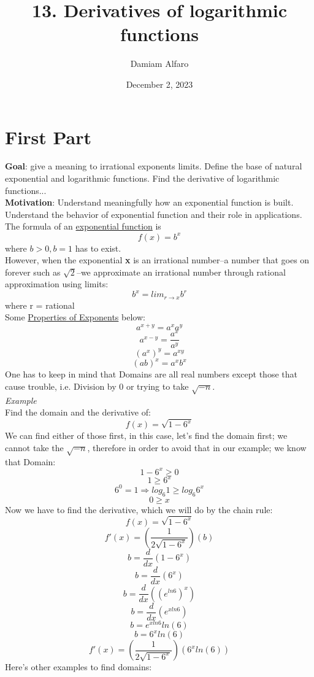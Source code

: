 \documentclass[12pt, letterpaper]{article}
\title{13. Derivatives of logarithmic functions}
\author{Damiam Alfaro}
\date{December 2, 2023} %
\begin{document}
\maketitle
\section{First Part}
\textbf{Goal}: give a meaning to irrational exponents limits. Define the base of natural exponential and logarithmic functions. Find the derivative of logarithmic functions...\\
\newline
\textbf{Motivation}: Understand meaningfully how an exponential function is built. Understand the behavior of exponential function and their role in applications.\\
\newline
The formula of an \underline{exponential function} is
\[f(x) = b^x \] where \(b > 0, b = 1\) has to exist.\\
\newline
However, when the exponential \textbf{x} is an irrational number--a number that goes on forever such as \(\sqrt{2}\)--we approximate an irrational number through rational approximation using limits:
\[b^x = lim_{r \to x} b^r\] where r = rational\\
\newline
Some \underline{Properties of Exponents} below:
\[a^{x+y} = a^xa^y\]
\[a^{x-y} = \frac{a^x}{a^y}\]
\[(a^{x})^{y} = a^{xy}\]
\[(ab)^{x} = a^{x}b^{x}\]
\newline
One has to keep in mind that Domains are all real numbers except those that cause trouble, i.e. Division by 0 or trying to take \(\sqrt{-n}\). \\
\newline
\textit{Example}\\
Find the domain and the derivative of:
\[f(x) = \sqrt{1-6^{x}}\]
We can find either of those first, in this case, let's find the domain first; we cannot take the \(\sqrt{-n}\), therefore in order to avoid that in our example; we know that Domain:
\[1-6^x \geq 0\]
\[1 \geq 6^x\]
\[6^0=1 \Rightarrow log_{6} 1 \geq log_{6} 6^x\]
\[0 \geq x\]
Now we have to find the derivative, which we will do by the chain rule:
\[f(x) = \sqrt{1-6^{x}}\]
\[f'(x) = (\frac{1}{2\sqrt{1-6^{x}}})(b)\]
\[b = \frac{d}{dx}(1-6^{x})\]
\[b = \frac{d}{dx}(6^x)\]
\[b = \frac{d}{dx}((e^{ln6})^x)\]
\[b = \frac{d}{dx}(e^{xln6})\]
\[b = e^{xln6}ln(6)\]
\[b = 6^{x}ln(6)\]
\[f'(x) = (\frac{1}{2\sqrt{1-6^{x}}})(6^{x}ln(6))\]
Here's other examples to find domains:
\end{document}
